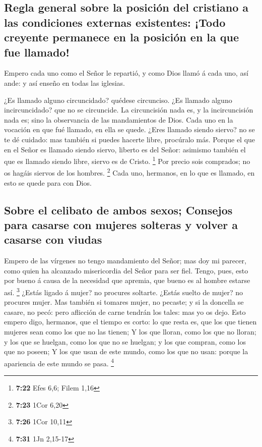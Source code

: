 \hypertarget{regla-general-sobre-la-posiciuxf3n-del-cristiano-a-las-condiciones-externas-existentes-todo-creyente-permanece-en-la-posiciuxf3n-en-la-que-fue-llamado}{%
\subsection{Regla general sobre la posición del cristiano a las
condiciones externas existentes: ¡Todo creyente permanece en la posición
en la que fue
llamado!}\label{regla-general-sobre-la-posiciuxf3n-del-cristiano-a-las-condiciones-externas-existentes-todo-creyente-permanece-en-la-posiciuxf3n-en-la-que-fue-llamado}}

 Empero cada uno como el Señor le repartió, y como Dios
llamó á cada uno, así ande: y así enseño en todas las iglesias.

 ¿Es llamado alguno circuncidado? quédese circunciso. ¿Es
llamado alguno incircuncidado? que no se circuncide.  La
circuncisión nada es, y la incircuncisión nada es; sino la observancia
de las mandamientos de Dios.  Cada uno en la vocación en
que fué llamado, en ella se quede.  ¿Eres llamado siendo
siervo? no se te dé cuidado: mas también si puedes hacerte libre,
procúralo más.  Porque el que en el Señor es llamado
siendo siervo, liberto es del Señor: asimismo también el que es llamado
siendo libre, siervo es de Cristo. \footnote{\textbf{7:22} Efes 6,6;
  Filem 1,16}  Por precio sois comprados; no os hagáis
siervos de los hombres. \footnote{\textbf{7:23} 1Cor 6,20}
 Cada uno, hermanos, en lo que es llamado, en esto se
quede para con Dios.

\hypertarget{sobre-el-celibato-de-ambos-sexos-consejos-para-casarse-con-mujeres-solteras-y-volver-a-casarse-con-viudas}{%
\subsection{Sobre el celibato de ambos sexos; Consejos para casarse con
mujeres solteras y volver a casarse con
viudas}\label{sobre-el-celibato-de-ambos-sexos-consejos-para-casarse-con-mujeres-solteras-y-volver-a-casarse-con-viudas}}

 Empero de las vírgenes no tengo mandamiento del Señor;
mas doy mi parecer, como quien ha alcanzado misericordia del Señor para
ser fiel.  Tengo, pues, esto por bueno á causa de la
necesidad que apremia, que bueno es al hombre estarse así. \footnote{\textbf{7:26}
  1Cor 10,11}  ¿Estás ligado á mujer? no procures
soltarte. ¿Estás suelto de mujer? no procures mujer.  Mas
también si tomares mujer, no pecaste; y si la doncella se casare, no
pecó: pero aflicción de carne tendrán los tales: mas yo os dejo.
 Esto empero digo, hermanos, que el tiempo es corto: lo
que resta es, que los que tienen mujeres sean como los que no las
tienen;  Y los que lloran, como los que no lloran; y los
que se huelgan, como los que no se huelgan; y los que compran, como los
que no poseen;  Y los que usan de este mundo, como los
que no usan: porque la apariencia de este mundo se pasa. \footnote{\textbf{7:31}
  1Jn 2,15-17}

